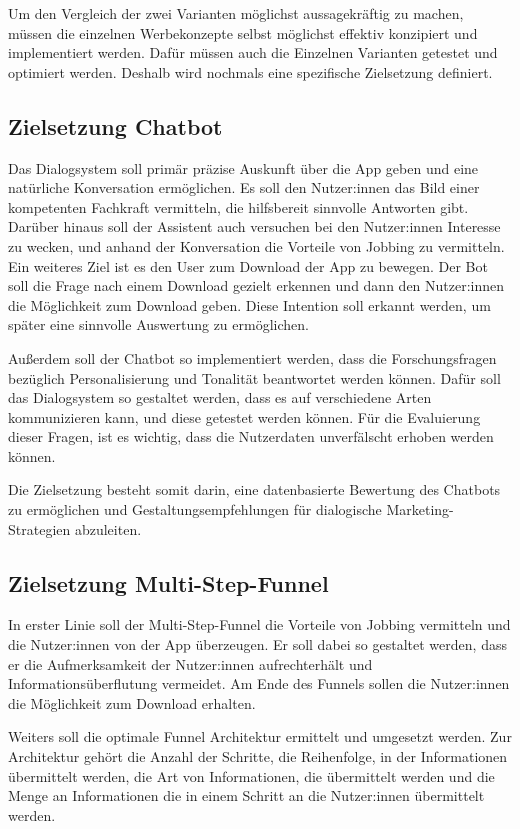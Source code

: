 Um den Vergleich der zwei Varianten möglichst aussagekräftig zu machen, müssen die einzelnen
Werbekonzepte selbst möglichst effektiv konzipiert und implementiert werden. Dafür müssen 
auch die Einzelnen Varianten getestet und optimiert werden. Deshalb wird nochmals eine 
spezifische Zielsetzung definiert.

\subsection{Zielsetzung Chatbot}

Das Dialogsystem soll primär präzise Auskunft über die App geben und eine 
natürliche Konversation ermöglichen. Es soll den Nutzer:innen das Bild einer kompetenten
Fachkraft vermitteln, die hilfsbereit sinnvolle Antworten gibt. Darüber hinaus
soll der Assistent auch versuchen bei den Nutzer:innen Interesse zu wecken, und anhand
der Konversation die Vorteile von Jobbing zu vermitteln. Ein weiteres Ziel ist
es den User zum Download der App zu bewegen. Der Bot soll die Frage nach einem Download
gezielt erkennen und dann den Nutzer:innen die Möglichkeit zum Download geben. Diese Intention
soll erkannt werden, um später eine sinnvolle Auswertung zu ermöglichen.

Außerdem soll der Chatbot so implementiert werden, dass die Forschungsfragen
bezüglich Personalisierung und Tonalität beantwortet werden können. Dafür soll
das Dialogsystem so gestaltet werden, dass es auf verschiedene Arten 
kommunizieren kann, und diese getestet werden können. Für die Evaluierung 
dieser Fragen, ist es wichtig, dass die Nutzerdaten unverfälscht erhoben werden
können.

Die Zielsetzung besteht somit darin, eine datenbasierte
Bewertung des Chatbots zu ermöglichen und
Gestaltungsempfehlungen für dialogische
Marketing-Strategien abzuleiten.

\setauthor{\firstauthor}
\subsection{Zielsetzung Multi-Step-Funnel}

In erster Linie soll der Multi-Step-Funnel die Vorteile von Jobbing vermitteln und 
die Nutzer:innen von der App überzeugen. Er soll dabei so gestaltet werden, dass er die Aufmerksamkeit der Nutzer:innen aufrechterhält 
und Informationsüberflutung vermeidet. 
Am Ende des Funnels sollen die Nutzer:innen die Möglichkeit zum Download erhalten.

Weiters soll die optimale Funnel Architektur ermittelt und umgesetzt werden.
Zur Architektur gehört die Anzahl der Schritte, die Reihenfolge, in der Informationen
übermittelt werden, die Art von Informationen, die übermittelt werden und die Menge an Informationen
die in einem Schritt an die Nutzer:innen übermittelt werden.

